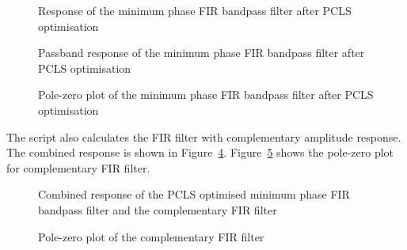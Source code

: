 \documentclass[a4paper,twoside,10pt,english]{report}
\begin{document}
\begin{figure}[!htbp]
\begin{center}
\scalebox{0.7}{}
\caption{Response of the minimum phase FIR bandpass filter after PCLS optimisation}
\label{fig:iir-sqp-slb-fir-bandpass-pcls-response}
\end{center}
\end{figure}
\begin{figure}[!htbp]
\begin{center}
\scalebox{0.7}{}
\caption{Passband response of the minimum phase FIR bandpass filter after PCLS optimisation}
\label{fig:iir-sqp-slb-fir-bandpass-pcls-passband-response}
\end{center}
\end{figure}
\begin{figure}[!htbp]
\begin{center}
\scalebox{0.7}{}
\caption{Pole-zero plot of the minimum phase FIR bandpass filter after PCLS optimisation}
\label{fig:iir-sqp-slb-fir-bandpass-pcls-pz}
\end{center}
\end{figure}

The script also calculates the FIR filter with complementary amplitude response.
The combined response is shown in
Figure~\ref{fig:iir-sqp-slb-fir-bandpass-d1c1-combined-response}.
Figure~\ref{fig:iir-sqp-slb-fir-bandpass-complementary-c1pz} shows the
pole-zero plot for complementary FIR filter.
\begin{figure}[!htbp]
\begin{center}
\scalebox{0.7}{}
\caption{Combined response of the PCLS optimised minimum phase FIR bandpass filter and the complementary FIR filter}
\label{fig:iir-sqp-slb-fir-bandpass-d1c1-combined-response}
\end{center}
\end{figure}
\begin{figure}[!htbp]
\begin{center}
\scalebox{0.7}{}
\caption{Pole-zero plot of the complementary FIR filter}
\label{fig:iir-sqp-slb-fir-bandpass-complementary-c1pz}
\end{center}
\end{figure}
\end{document}
